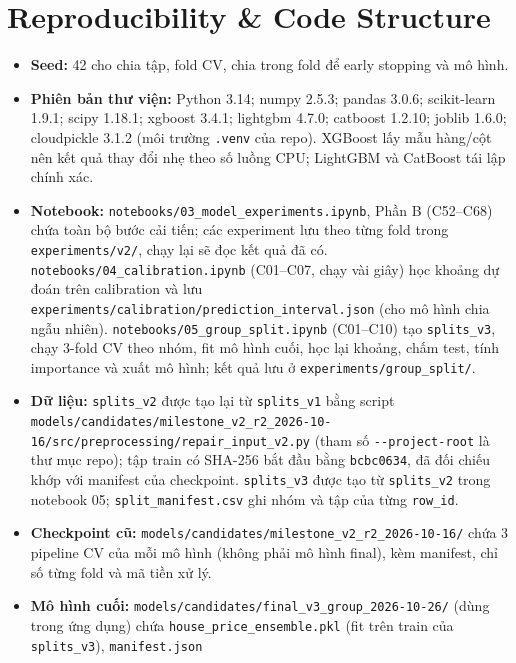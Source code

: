 \documentclass[11pt]{article}
\begin{document}
\section{Reproducibility \& Code Structure}

\begin{itemize}
    \item \textbf{Seed:} 42 cho chia tập, fold CV, chia trong fold để early stopping và mô hình.
    \item \textbf{Phiên bản thư viện:} Python 3.14; numpy 2.5.3; pandas 3.0.6; scikit-learn 1.9.1; scipy 1.18.1;
          xgboost 3.4.1; lightgbm 4.7.0; catboost 1.2.10; joblib 1.6.0; cloudpickle 3.1.2 (môi trường \texttt{.venv}
          của repo). XGBoost lấy mẫu hàng/cột nên kết quả thay đổi nhẹ theo số luồng CPU; LightGBM và CatBoost tái lập
          chính xác.
    \item \textbf{Notebook:} \nolinkurl{notebooks/03_model_experiments.ipynb}, Phần B (C52--C68) chứa toàn bộ bước
          cải tiến; các experiment lưu theo từng fold trong \nolinkurl{experiments/v2/}, chạy lại sẽ đọc kết quả đã có.
          \nolinkurl{notebooks/04_calibration.ipynb} (C01--C07, chạy vài giây) học khoảng dự đoán trên calibration và
          lưu \nolinkurl{experiments/calibration/prediction_interval.json} (cho mô hình chia ngẫu nhiên).
          \nolinkurl{notebooks/05_group_split.ipynb} (C01--C10) tạo \texttt{splits\_v3}, chạy 3-fold CV
          theo nhóm, fit mô hình cuối, học lại khoảng, chấm test, tính importance và xuất mô hình; kết quả lưu ở
          \nolinkurl{experiments/group_split/}.
    \item \textbf{Dữ liệu:} \texttt{splits\_v2} được tạo lại từ \texttt{splits\_v1} bằng
          script \nolinkurl{models/candidates/milestone_v2_r2_2026-10-16/src/preprocessing/repair_input_v2.py} (tham số
          \texttt{-{}-project-root} là thư mục repo); tập train có SHA-256 bắt đầu bằng
          \texttt{bcbc0634}, đã đối chiếu khớp với manifest của checkpoint. \texttt{splits\_v3} được tạo từ
          \texttt{splits\_v2} trong notebook 05; \nolinkurl{split_manifest.csv} ghi nhóm và tập của từng \texttt{row\_id}.
    \item \textbf{Checkpoint cũ:} \nolinkurl{models/candidates/milestone_v2_r2_2026-10-16/} chứa 3 pipeline CV của
          mỗi mô hình (không phải mô hình final), kèm manifest, chỉ số từng fold và mã tiền xử lý.
    \item \textbf{Mô hình cuối:} \nolinkurl{models/candidates/final_v3_group_2026-10-26/} (dùng trong ứng dụng) chứa
          \nolinkurl{house_price_ensemble.pkl} (fit trên train của \texttt{splits\_v3}), \nolinkurl{manifest.json}

\end{itemize}
\end{document}
